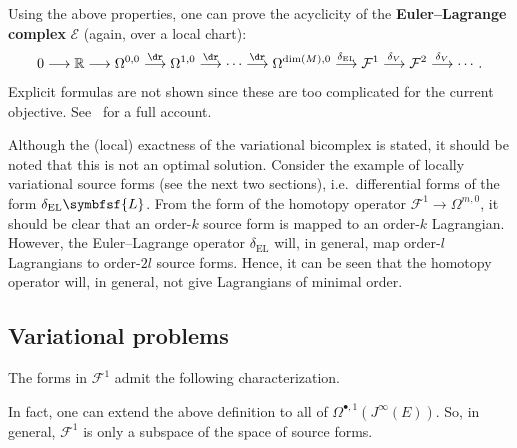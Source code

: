     Using the above properties, one can prove the acyclicity of the \textbf{Euler--Lagrange complex} $\mathcal{E}$ (again, over a local chart):
    \begin{gather}
        0\longrightarrow\mathbb{R}\longrightarrow\Omega^{0,0}\overset{\dr}{\longrightarrow}\Omega^{1,0}\overset{\dr}{\longrightarrow}\cdots\overset{\dr}{\longrightarrow}\Omega^{\dim(M),0}\overset{\delta_\mathrm{EL}}{\longrightarrow}\mathcal{F}^1\overset{\delta_V}{\longrightarrow}\mathcal{F}^2\overset{\delta_V}{\longrightarrow}\cdots\,.
    \end{gather}
    Explicit formulas are not shown since these are too complicated for the current objective. See~\cite{anderson_variational_1992} for a full account.

    \begin{remark}
        Although the (local) exactness of the variational bicomplex is stated, it should be noted that this is not an optimal solution. Consider the example of locally variational source forms (see the next two sections), i.e.~differential forms of the form $\delta_{\text{EL}}\symbfsf{L}$. From the form of the homotopy operator $\mathcal{F}^1\rightarrow\Omega^{m,0}$, it should be clear that an order-$k$ source form is mapped to an order-$k$ Lagrangian. However, the Euler--Lagrange operator $\delta_{\text{EL}}$ will, in general, map order-$l$ Lagrangians to order-$2l$ source forms. Hence, it can be seen that the homotopy operator will, in general, not give Lagrangians of minimal order.
    \end{remark}

\subsection{Variational problems}\label{section:variational_problems}

    The forms in $\mathcal{F}^1$ admit the following characterization.
    \begin{remark*}
        In fact, one can extend the above definition to all of $\Omega^{\bullet,1}(J^\infty(E))$. So, in general, $\mathcal{F}^1$ is only a subspace of the space of source forms.
    \end{remark*}

